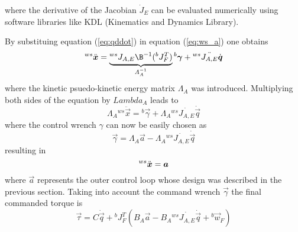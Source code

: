 where the derivative of the Jacobian $\dot{J}_{E}$ can be evaluated numerically
using software libraries like KDL (Kinematics and Dynamics Library).
\par
By substituing equation (\ref{eq:qddot}) in equation (\ref{eq:ws_a}) one obtains
\[
\prescript{ws}{}{\ddot{\vec{x}}} = \underbrace{{}^{ws} J_{A,E} \B^{-1} ({}^b J_{F}^T)}_{\Lambda_A^{-1}} {}^b \vec{\gamma} + {}^{ws} \ddot{J_{A,E}} \dot{\vec{q}}
\]
where the kinetic psuedo-kinetic energy matrix $\Lambda_{A}$ was introduced. Multiplying both sides of the equation
by $Lambda_{A}$ leads to
\[
\Lambda_A {}^{ws} \ddot{\vec{x}} =  {}^b \vec{\gamma} +  \Lambda_A  {}^{ws} \dot{J_{A,E}} \dot{\vec{q}}
\]
where the control wrench $\gamma$ can now be easily chosen as
\[\label{eq:gamma}
\vec{\gamma} = \Lambda_A \vec{a} - \Lambda_A {}^{ws} \dot{J_{A,E}} \dot{\vec{q}}
\]
resulting in
\[
\prescript{ws}{}{\ddot{\vec{x}}} = \vec{a}
\]
where $\vec{a}$ represents the outer control loop whose design was described in the previous
section. Taking into account the command wrench $\vec{\gamma}$ the final commanded torque is
\begin{equation}\label{eq:torque_wo_null}
  \vec{\tau} = C \dot{\vec{q}} + {}^{b}J^{T}_{F} ( B_A \vec{a} - B_A {}^{ws} \dot{J_{A,E}} \dot{\vec{q}} + {}^b\vec{w}_{F})
\end{equation}

